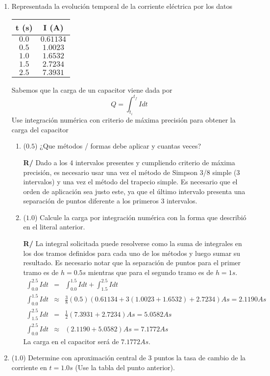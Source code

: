 \documentclass[12pt]{article}
\begin{document}
\vspace{-.5cm}
  \begin{enumerate}[leftmargin=*,widest=9]
    \item Representada la evolución temporal de la corriente eléctrica por los datos
    \begin{center}
   		\begin{tabular}{ | c | c | }
     \hline
     t (s) & I (A) \\ \hline
     $0.0$ & $0.61134$ \\ \hline
     $0.5$ & $1.0023$ \\ \hline
     $1.0$ & $1.6532$ \\ \hline
     $1.5$ & $2.7234$ \\ \hline
     $2.5$ & $7.3931$ \\
     \hline
   		\end{tabular}
 	\end{center}
   Sabemos que la carga de un capacitor viene dada por $$Q = \int_{t_i}^{t_f} I dt$$ Use integración numérica con criterio de máxima precisión para obtener la carga del capacitor
   \begin{enumerate}[label=\alph*]
    \item (\(0.5\)) ¿Que métodos / formas debe aplicar y cuantas veces?

\textbf{R/} Dado a los 4 intervalos presentes y cumpliendo criterio de máxima precisión, es necesario usar una vez el método de Simpson 3/8 simple (3 intervalos) y una vez el método del trapecio simple. Es necesario que el orden de aplicación sea justo este, ya que el último intervalo presenta una separación de puntos diferente a los primeros 3 intervalos.
    \item (\(1.0\)) Calcule la carga por integración numérica con la forma que describió en el literal anterior.

\textbf{R/} La integral solicitada puede resolverse como la suma de integrales en los dos tramos definidos para cada uno de los métodos y luego sumar su resultado. Es necesario notar que la separación de puntos para el primer tramo es de \(h=0.5s\) mientras que para el segundo tramo es de \(h=1s\).
\begin{eqnarray*}
\int_{0.0}^{2.5}Idt &=& \int_{0.0}^{1.5}Idt + \int_{1.5}^{2.5}Idt \\
\int_{0.0}^{1.5}Idt &\approx & \frac{3}{8}(0.5)(0.61134 + 3(1.0023+1.6532)+2.7234)As = 2.1190As\\
\int_{1.5}^{2.5}Idt &=& \frac{1}{2}(7.3931+2.7234)As = 5.0582As\\
\int_{0.0}^{2.5}Idt &\approx & (2.1190+5.0582)As = 7.1772As
\end{eqnarray*}
La carga en el capacitor será de \(7.1772As\).
    \end{enumerate}
    \item (\(1.0\)) Determine con aproximación central de 3 puntos la tasa de cambio de la corriente en $t = 1.0 s$ (Use la tabla del punto anterior).


\end{enumerate}
\end{document}
